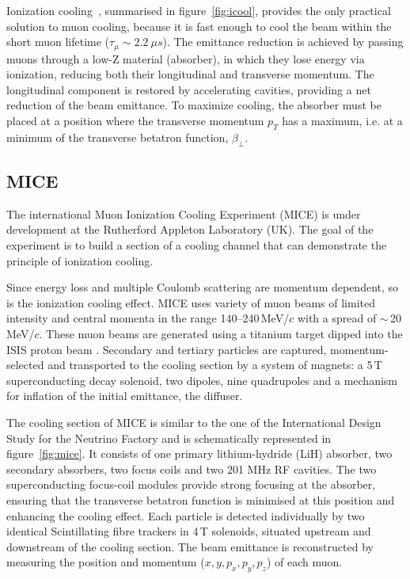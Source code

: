 \documentclass[a4paper,11pt]{article}
\begin{document}
Ionization cooling~\cite{icool1}, summarised in figure~\ref{fig:icool}, provides the only practical solution to muon cooling,
because it is fast enough to cool the beam within the short muon lifetime ($\tau_\mu \sim 2.2 \ \mu s$). The emittance reduction is
achieved by passing muons through a low-Z material (absorber), in which they
lose energy via ionization, reducing both their longitudinal and transverse momentum. The
longitudinal component is restored by accelerating cavities, providing a net reduction of the beam emittance. To
maximize cooling, the absorber must be placed at a position where the transverse momentum $p_T$ has a maximum, i.e. at a minimum of
the transverse betatron function, $\beta_{\perp}$.

\subsection{MICE}
The international Muon Ionization Cooling Experiment (MICE) \cite{MICEweb} is under development at the Rutherford Appleton
Laboratory (UK). The goal of the experiment is to build a section of a cooling channel that can demonstrate the principle
of ionization cooling.

Since energy loss and multiple Coulomb scattering are momentum dependent, so is the ionization cooling effect. MICE uses variety of muon beams of limited intensity and central momenta in the
range 140--240\,MeV/$c$ with a spread of $\sim$\,20\,MeV/$c$. These muon beams are generated using a titanium target
\cite{target} dipped into the ISIS proton beam \cite{isis}. Secondary and tertiary particles are captured,
momentum-selected and transported to the cooling section by a system of magnets: a 5\,T superconducting
decay solenoid, two dipoles, nine quadrupoles and a mechanism for inflation of the initial emittance, the diffuser.

The cooling section of MICE is similar to the one of the International Design Study
for the Neutrino Factory and is schematically represented in figure~\ref{fig:mice}. It consists of one primary lithium-hydride (LiH) absorber, two secondary absorbers,
two focus coils and two 201 MHz RF cavities. The two superconducting focus-coil modules provide strong focusing at the
absorber, ensuring that the transverse betatron function is minimised at this position and enhancing the cooling effect. 
Each particle is detected individually by two identical Scintillating fibre trackers in 4\,T
solenoids, situated upstream and downstream of the cooling section. The beam emittance is reconstructed by measuring the
position and momentum ($x,y,p_x,p_y,p_z$) of each muon.
\end{document}
